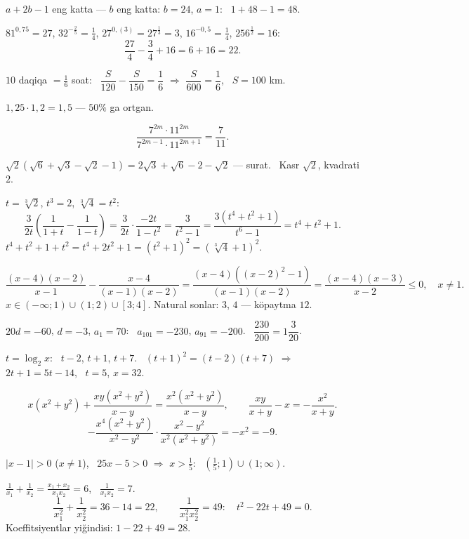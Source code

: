 




$a+2b-1$ eng katta — $b$ eng katta: $b=24$, $a=1$: \ $1+48-1=48$.

$81^{0{,}75}=27$, $32^{-\frac25}=\frac14$, $27^{0{,}(3)}=27^{\frac13}=3$, $16^{-0{,}5}=\frac14$, $256^{\frac12}=16$:
\[\frac{27}4-\frac34+16=6+16=22.\]

$10$ daqiqa $=\frac16$ soat: \ $\dfrac S{120}-\dfrac S{150}=\dfrac16$ $\Rightarrow$ $\dfrac S{600}=\dfrac16$, \ $S=100$ km.

$1{,}25\cdot1{,}2=1{,}5$ — $50\%$ ga ortgan.

\[\frac{7^{2m}\cdot11^{2m}}{7^{2m-1}\cdot11^{2m+1}}=\frac7{11}.\]

$\sqrt2\left(\sqrt6+\sqrt3-\sqrt2-1\right)=2\sqrt3+\sqrt6-2-\sqrt2$ — surat. \ Kasr $\sqrt2$, kvadrati $2$.

$t=\sqrt[3]2$, $t^3=2$, $\sqrt[3]4=t^2$:
\[\frac3{2t}\left(\frac1{1+t}-\frac1{1-t}\right)=\frac3{2t}\cdot\frac{-2t}{1-t^2}=\frac3{t^2-1}=\frac{3\left(t^4+t^2+1\right)}{t^6-1}=t^4+t^2+1.\]
$t^4+t^2+1+t^2=t^4+2t^2+1=\left(t^2+1\right)^2=\left(\sqrt[3]4+1\right)^2$.

\[\frac{(x-4)(x-2)}{x-1}-\frac{x-4}{(x-1)(x-2)}=\frac{(x-4)\left((x-2)^2-1\right)}{(x-1)(x-2)}=\frac{(x-4)(x-3)}{x-2}\le0,\quad x\ne1.\]
$x\in(-\infty;1)\cup(1;2)\cup[3;4]$. Natural sonlar: $3$, $4$ — köpaytma $12$.

$20d=-60$, $d=-3$, $a_1=70$: \ $a_{101}=-230$, $a_{91}=-200$. \ $\dfrac{230}{200}=1\dfrac3{20}$.

$t=\log_2x$: \ $t-2$, $t+1$, $t+7$. \ $(t+1)^2=(t-2)(t+7)$ $\Rightarrow$ $2t+1=5t-14$, \ $t=5$, $x=32$.

\[x\left(x^2+y^2\right)+\frac{xy\left(x^2+y^2\right)}{x-y}=\frac{x^2\left(x^2+y^2\right)}{x-y},\qquad \frac{xy}{x+y}-x=-\frac{x^2}{x+y}.\]
\[-\frac{x^4\left(x^2+y^2\right)}{x^2-y^2}\cdot\frac{x^2-y^2}{x^2\left(x^2+y^2\right)}=-x^2=-9.\]

$|x-1|>0$ ($x\ne1$), \ $25x-5>0$ $\Rightarrow$ $x>\frac15$: \ $\left(\frac15;1\right)\cup(1;\infty)$.

$\frac1{x_1}+\frac1{x_2}=\frac{x_1+x_2}{x_1x_2}=6$, \ $\frac1{x_1x_2}=7$.
\[\frac1{x_1^2}+\frac1{x_2^2}=36-14=22,\qquad \frac1{x_1^2x_2^2}=49:\quad t^2-22t+49=0.\]
Koeffitsiyentlar yiğindisi: $1-22+49=28$.

